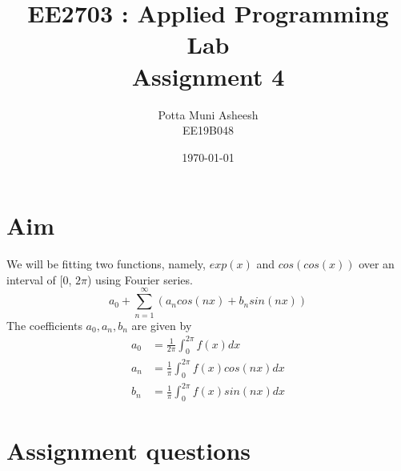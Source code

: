 \documentclass[12pt, a4paper]{article}
\title{\textbf{EE2703 : Applied Programming Lab \\ Assignment 4}} %
\author{Potta Muni Asheesh \\ EE19B048} %
\date{\today} %
\begin{document}
	
		
\maketitle %
\section{Aim}
 We will be fitting two functions, namely, $exp(x)$ and $cos(cos(x))$ over an interval of [0, $2\pi$) using Fourier series.
 \begin{equation*}
 	a_0 + \sum_{n=1}^{\infty}(a_{n}cos(nx)+b_{n}sin(nx))
 \end{equation*}
 The coefficients $a_0, a_{n}, b_{n}$ are given by
 \begin{align*}
 	a_0 &= \frac{1}{2\pi} \int_{0}^{2\pi}f(x)dx \\
 	a_n &= \frac{1}{\pi} \int_{0}^{2\pi}f(x)cos(nx)dx \\
 	b_n &= \frac{1}{\pi} \int_{0}^{2\pi}f(x)sin(nx)dx
 \end{align*}  
 
\section{Assignment questions}
\end{document}
